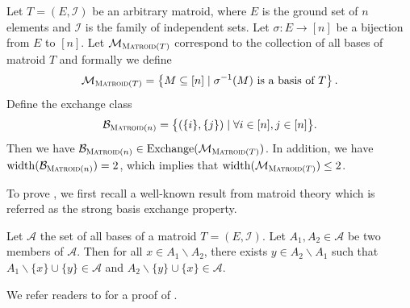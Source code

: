 \documentclass{article}
\newcommand{\M}{\mathcal M}
\newcommand{\B}{\mathcal B}
\newcommand{\del}{\backslash}
\DeclareMathOperator{\rank}{width}
\DeclareMathOperator{\Exchange}{Exchange}
\newcommand{\Matroid}{\textsc{Matroid}\xspace}
\begin{document}
\begin{fact}[Matroid]
\label{fact:matroid}
Let $T=(E,\mathcal I)$ be an arbitrary matroid, where $E$ is the ground set of $n$ elements and $\mathcal I$ is the family of independent sets.
Let $\sigma\colon E\rightarrow [n]$ be a bijection from $E$ to $[n]$.
Let $\M_{\Matroid(T)}$ correspond to the collection of all bases of matroid $T$ and formally we define
\begin{equation}
\label{eq:matroid}
\M_{\Matroid(T)} = \left\{M\subseteq[n] \mid \sigma^{-1}(M)\text{ is a basis of } T\right\}.
\end{equation}
Define the exchange class
\begin{equation}
\label{eq:bmatroid}
\B_{\Matroid(n)}=\big\{(\{i\},\{j\})\mid\forall i\in [n], j\in [n]\big\}.
\end{equation}
Then we have $\B_{\Matroid(n)} \in \Exchange(\M_{\Matroid(T)})$.
In addition, we have $\rank(\B_{\Matroid(n)}) = 2$, which implies that $\rank(\M_{\Matroid(T)}) \le 2$. 
\end{fact}

To prove , we first recall a well-known result from matroid theory which is referred as the strong basis exchange property.
\begin{lemma}
\label{lemma:basis-exchange}
Let $\mathcal A$ the set of all bases of a matroid $T=(E,\mathcal I)$. 
Let $A_1,A_2 \in \mathcal A$ be two members of $\mathcal A$.
Then for all $x \in A_1\del A_2$, there exists $y\in A_2\del A_1$ 
such that $A_1\del \{x\} \cup \{y\} \in \mathcal A$ and $A_2\del\{y\}\cup\{x\} \in \mathcal A$.
\end{lemma}
We refer readers to \citep{oxley2006matroid} for a proof of .
\end{document}

